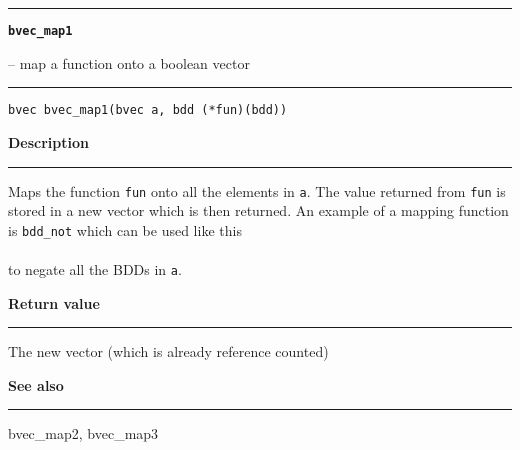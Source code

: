 \vspace{8ex}
\begin{minipage}{\textwidth}

\noindent\begin{minipage}{\textwidth}
\rule{\textwidth}{0.5mm}
{\tt\bf bvec\_map1 }
\--- map a function onto a boolean vector  \hspace{\fill}
\\\rule[1.5ex]{\textwidth}{0.5mm}
\end{minipage}

\noindent\begin{verbatim}
bvec bvec_map1(bvec a, bdd (*fun)(bdd)) 
\end{verbatim}

\vspace{\parsep}\noindent
{\bf Description}\\\rule[1.5ex]{\textwidth}{0.2mm}\vspace{-1.5ex}\setlength{\parindent}{1em}
Maps the function {\tt fun} onto all the elements in {\tt a}. The
           value returned from {\tt fun} is stored in a new vector which
	   is then returned. An example of a mapping function is
	   {\tt bdd\_not} which can be used like this\\

	   \\

	   \noindent to negate all the BDDs in {\tt a}.

\setlength{\parindent}{0em}\vspace{\parsep}\vspace{\baselineskip}\noindent
{\bf Return value}\\\rule[1.5ex]{\textwidth}{0.2mm}\vspace{-1.5ex}
The new vector (which is already reference counted) 

\vspace{\parsep}\vspace{\baselineskip}\noindent
{\bf See also}\\\rule[1.5ex]{\textwidth}{0.2mm}\vspace{-1.5ex}
bvec\_map2, bvec\_map3 
\end{minipage}
\vspace{8ex}
